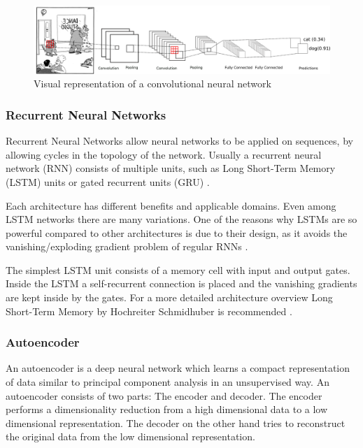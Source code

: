 \documentclass[draft,final,oneside]{vutinfth} %
\begin{document}
\begin{figure}[ht]
	\centering
  	\includegraphics[width=1.0\textwidth]{graphics/cnn.png}
	\caption{Visual representation of a convolutional neural network}
	\label{fig:feedforward}
\end{figure}
\pagebreak


\subsubsection{Recurrent Neural Networks}
Recurrent Neural Networks allow neural networks to be applied on sequences, by allowing cycles in the topology of the network. Usually a recurrent neural network (RNN) consists of multiple units, such as Long Short-Term Memory (LSTM) units or gated recurrent units (GRU) \cite{gru}.

Each architecture has different benefits and applicable domains. Even among LSTM networks there are many variations. One of the reasons why LSTMs are so powerful compared to other architectures is due to their design, as it avoids the vanishing/exploding gradient problem of regular RNNs \cite {vanishinggradient}.

The simplest LSTM unit consists of a memory cell with input and output gates. Inside the LSTM a self-recurrent connection is placed and the vanishing gradients are kept inside by the gates. For a more detailed architecture overview Long Short-Term Memory by Hochreiter Schmidhuber is recommended \cite{hochreiter}.


\subsubsection{Autoencoder}

An autoencoder is a deep neural network which learns a compact representation of data similar to principal component analysis in an unsupervised way. An autoencoder consists of two parts: The encoder and decoder. The encoder performs a dimensionality reduction from a high dimensional data to a low dimensional representation. The decoder on the other hand tries to reconstruct the original data from the low dimensional representation.
\end{document}
